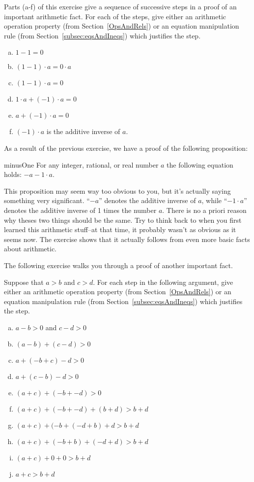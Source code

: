 \begin{exercise}{}
Parts (a-f) of this exercise give a sequence of successive steps in a proof of an important arithmetic fact. For each of the steps, give either an arithmetic operation property (from Section~\ref{OpsAndRels}) or an equation manipulation rule (from Section~\ref{subsec:eqsAndIneqs}) which justifies the step.
\begin{enumerate}[(a)]
\item
$1 -1 = 0$
\item
$(1-1)\cdot a = 0 \cdot a$
\item
$(1-1)\cdot a = 0$
\item
$1 \cdot a + (-1) \cdot a = 0$
\item
$a + (-1) \cdot a = 0$
\item
$(-1) \cdot a$ is the additive inverse of $a$.
\end{enumerate}
\end{exercise}

As a result of the previous exercise, we have a proof of the following proposition:

\begin{prop}{minusOne}
For any integer, rational, or real number $a$ the following equation holds: $ -a -1 \cdot a $. 
\end{prop}
This proposition may seem way too obvious to you, but it's actually saying something very significant. ``$-a$'' denotes the additive inverse of $a$, while ``$-1 \cdot a$'' denotes the additive inverse of 1 times the number $a$. There is no a priori reason why theses two things should be the same. Try to think back to when you first learned this arithmetic stuff--at that time, it probably wasn't as obvious as it seems now. The exercise shows that it actually follows from even more basic facts about arithmetic.


The following exercise walks you through a proof of another important fact.

\begin{exercise}{}
Suppose that $a>b$ and $c>d$. For each step in the following argument, give either an arithmetic operation property (from Section~\ref{OpsAndRels}) or an equation manipulation rule (from Section~\ref{subsec:eqsAndIneqs}) which justifies the step.
\begin{enumerate}[(a)]
\item
$a-b>0$ and $c-d>0$
\item
$(a-b) + (c-d) > 0$
\item
$a + (-b+c) - d > 0$
\item
$a + (c-b) - d > 0$
\item
$(a+c) + (-b + -d) > 0$
\item
$(a+c) + (-b + -d) + (b+d) > b+d$
\item
$(a+c) + (-b + (-d + b)+d > b+d$
\item
$(a+c) + (-b + b) + (-d+d) > b+d$
\item
$(a+c) + 0 + 0 > b+d$
\item
$a+c > b+d$
\end{enumerate}
\end{exercise}

